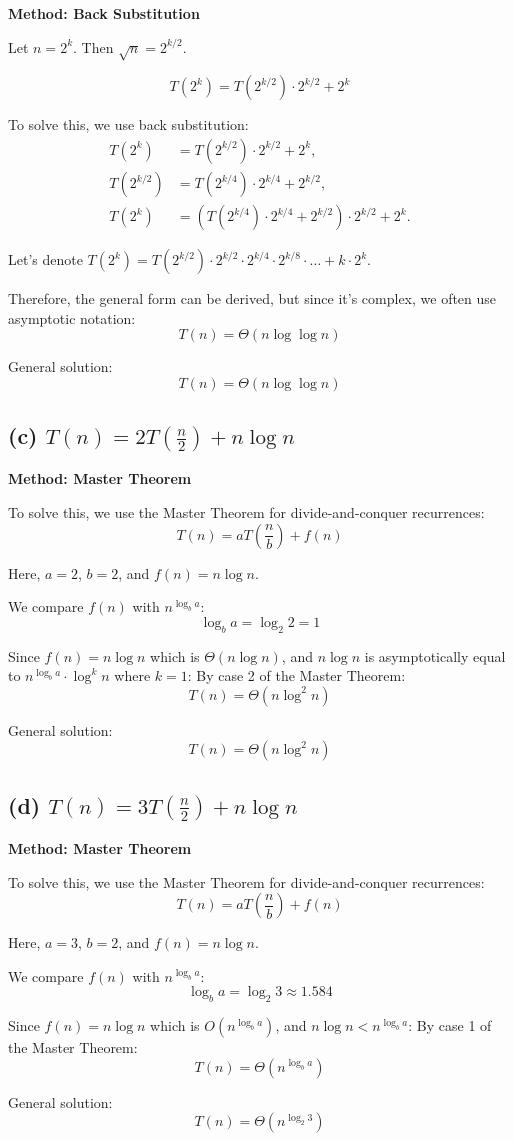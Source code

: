 \documentclass{article}
\begin{document}
\textbf{Method: Back Substitution}

Let \( n = 2^k \). Then \( \sqrt{n} = 2^{k/2} \).

\[ T(2^k) = T(2^{k/2}) \cdot 2^{k/2} + 2^k \]

To solve this, we use back substitution:
\begin{align*}
T(2^k) &= T(2^{k/2}) \cdot 2^{k/2} + 2^k, \\
T(2^{k/2}) &= T(2^{k/4}) \cdot 2^{k/4} + 2^{k/2}, \\
T(2^k) &= \left( T(2^{k/4}) \cdot 2^{k/4} + 2^{k/2} \right) \cdot 2^{k/2} + 2^k.
\end{align*}

Let's denote \( T(2^k) = T(2^{k/2}) \cdot 2^{k/2} \cdot 2^{k/4} \cdot 2^{k/8} \cdot \ldots + k \cdot 2^k \).

Therefore, the general form can be derived, but since it's complex, we often use asymptotic notation:
\[ T(n) = \Theta(n \log \log n) \]

General solution:
\[ T(n) = \Theta(n \log \log n) \]

\subsection*{(c) \( T(n) = 2T \left( \frac{n}{2} \right) + n \log n \)}

\textbf{Method: Master Theorem}

To solve this, we use the Master Theorem for divide-and-conquer recurrences:
\[ T(n) = aT \left( \frac{n}{b} \right) + f(n) \]

Here, \( a = 2 \), \( b = 2 \), and \( f(n) = n \log n \).

We compare \( f(n) \) with \( n^{\log_b a} \):
\[ \log_b a = \log_2 2 = 1 \]

Since \( f(n) = n \log n \) which is \( \Theta(n \log n) \), and \( n \log n \) is asymptotically equal to \( n^{\log_b a} \cdot \log^k n \) where \( k = 1 \):
By case 2 of the Master Theorem:
\[ T(n) = \Theta(n \log^2 n) \]

General solution:
\[ T(n) = \Theta(n \log^2 n) \]

\subsection*{(d) \( T(n) = 3T \left( \frac{n}{2} \right) + n \log n \)}

\textbf{Method: Master Theorem}

To solve this, we use the Master Theorem for divide-and-conquer recurrences:
\[ T(n) = aT \left( \frac{n}{b} \right) + f(n) \]

Here, \( a = 3 \), \( b = 2 \), and \( f(n) = n \log n \).

We compare \( f(n) \) with \( n^{\log_b a} \):
\[ \log_b a = \log_2 3 \approx 1.584 \]

Since \( f(n) = n \log n \) which is \( O(n^{\log_b a}) \), and \( n \log n < n^{\log_b a} \):
By case 1 of the Master Theorem:
\[ T(n) = \Theta(n^{\log_b a}) \]

General solution:
\[ T(n) = \Theta(n^{\log_2 3}) \]
\end{document}
